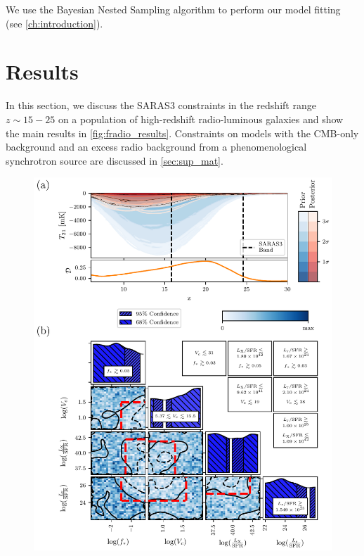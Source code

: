 We use the Bayesian Nested Sampling algorithm to perform our model fitting \cite{skilling_nested_2004} (see \cref{ch:introduction}).

\section{Results} \label{sec:results_saras3}

In this section, we discuss the SARAS3 constraints in the redshift range $z\sim 15-25$ on a population of high-redshift radio-luminous galaxies and show the main results in \cref{fig:fradio_results}. Constraints on models with the CMB-only background and an excess radio background from a phenomenological synchrotron source \cite{Fialkov2019} are discussed in \cref{sec:sup_mat}. 

\begin{figure}
    \centering
    \includegraphics{saras3/figs/Figure1.pdf}

\end{figure}
